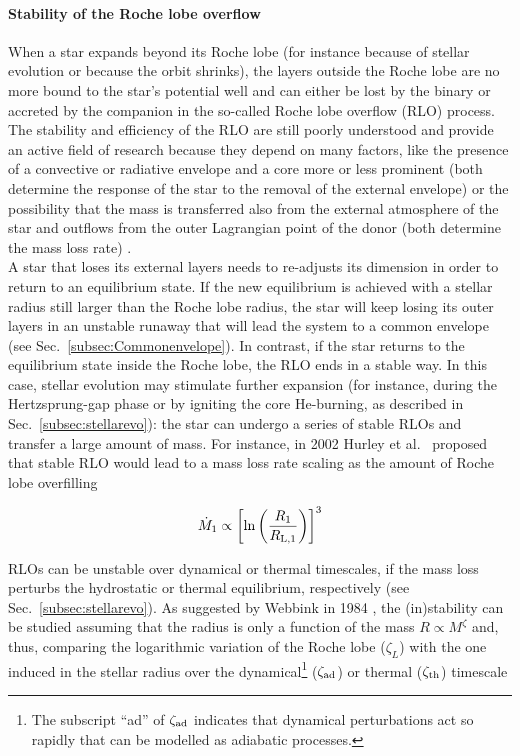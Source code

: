 \documentclass[a4paper,titlepage]{book}     	%
\newcommand{\mdot}{\ensuremath{\dot{M}}}
\newcommand{\rlone}{\ensuremath{R_\textup{L,1}}}
\begin{document}
\paragraph{Stability of the Roche lobe overflow} When a star expands beyond its Roche lobe (for instance because of stellar evolution or because the orbit shrinks), the layers outside the Roche lobe are no more bound to the star's potential well and can either be lost by the binary or accreted by the companion in the so-called Roche lobe overflow (RLO) process. The stability and efficiency of the RLO are still poorly understood and provide an active field of research because they depend on many factors, like the presence of a convective or radiative envelope and a core more or less prominent (both determine the response of the star to the removal of the external envelope) or the possibility that the mass is transferred also from the external atmosphere of the star and outflows from the outer Lagrangian point of the donor (both determine the mass loss rate) \cite{marchant2021_masstransferMESA}.\\

A star that loses its external layers needs to re-adjusts its dimension in order to return to an equilibrium state. If the new equilibrium is achieved with a stellar radius still larger than the Roche lobe radius, the star will keep losing its outer layers in an unstable runaway that will lead the system to a common envelope (see Sec.\ \ref{subsec:Commonenvelope}). In contrast, if the star returns to the equilibrium state inside the Roche lobe, the RLO ends in a stable way. In this case, stellar evolution may stimulate further expansion (for instance, during the Hertzsprung-gap phase or by igniting the core He-burning, as described in Sec.\ \ref{subsec:stellarevo}): the star can undergo a series of stable RLOs and transfer a large amount of mass. For instance, in 2002 Hurley et al.\ \cite{Hurley2002} proposed that stable RLO would lead to a mass loss rate scaling as the amount of Roche lobe overfilling 

\begin{equation}\label{eq:masslostRoche}
    \mdot_1 \propto \left[ \ln \left(\frac{R_1}{\rlone} \right)\right]^3
\end{equation}

RLOs can be unstable over dynamical or thermal timescales, if the mass loss perturbs the hydrostatic or thermal equilibrium, respectively (see Sec.\ \ref{subsec:stellarevo}). As suggested by Webbink in 1984 \cite{Webbink1984_CE}, the (in)stability can be studied assuming that the radius is only a function of the mass $R\propto M^{\zeta}$ and, thus, comparing the logarithmic variation of the Roche lobe ($\zeta_L$) with the one induced in the stellar radius over the dynamical\footnote{The subscript ``ad'' of $\zeta_{\rm ad}$ indicates that dynamical perturbations act so rapidly that can be modelled as adiabatic processes.} ($\zeta_\textup{ad}$) or thermal ($\zeta_\textup{th}$) timescale
\end{document}
